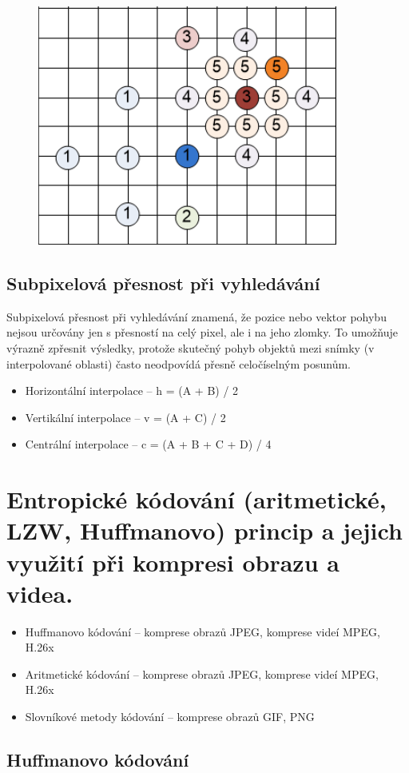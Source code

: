 \begin{figure}[ht]
    \centering
    \includegraphics[width=0.3\linewidth]{images/TSS.png}
\end{figure}
\FloatBarrier

\subsection{Subpixelová přesnost při vyhledávání}

Subpixelová přesnost při vyhledávání znamená, že pozice nebo vektor pohybu nejsou určovány jen s přesností na celý pixel, ale i na jeho zlomky. To umožňuje výrazně zpřesnit výsledky, protože skutečný pohyb objektů mezi snímky (v interpolované oblasti) často neodpovídá přesně celočíselným posunům.

\begin{itemize}
    \item Horizontální interpolace -- h = (A + B) / 2
    \item Vertikální interpolace -- v = (A + C) / 2
    \item Centrální interpolace -- c = (A + B + C + D) / 4
\end{itemize}


\section{Entropické kódování (aritmetické, LZW, Huffmanovo) princip a jejich využití při kompresi obrazu a videa.}

\begin{itemize}
    \item Huffmanovo kódování -- komprese obrazů JPEG, komprese videí MPEG, H.26x
    \item Aritmetické kódování -- komprese obrazů JPEG, komprese videí MPEG, H.26x
    \item Slovníkové metody kódování -- komprese obrazů GIF, PNG
\end{itemize}

\subsection{Huffmanovo kódování}

